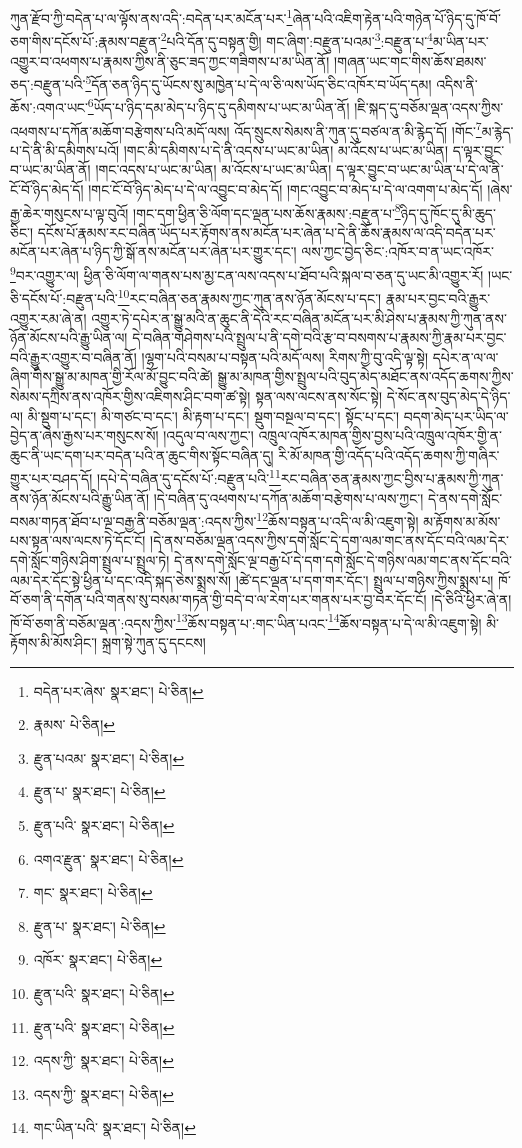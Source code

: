 ཀུན་རྫོབ་ཀྱི་བདེན་པ་ལ་ལྟོས་ནས་འདི་:བདེན་པར་མངོན་པར་\footnote{བདེན་པར་ཞེས་  སྣར་ཐང་།  པེ་ཅིན། }ཞེན་པའི་འཇིག་རྟེན་པའི་གཉེན་པོ་ཉིད་དུ་ཁོ་བོ་ཅག་གིས་དངོས་པོ་:རྣམས་བརྫུན་\footnote{རྣམས་  པེ་ཅིན། }པའི་དོན་དུ་བསྟན་གྱི། གང་ཞིག་:བརྫུན་པའམ་\footnote{རྫུན་པའམ་  སྣར་ཐང་།  པེ་ཅིན། }:བརྫུན་པ་\footnote{རྫུན་པ་  སྣར་ཐང་།  པེ་ཅིན། }མ་ཡིན་པར་འགྱུར་བ་འཕགས་པ་རྣམས་ཀྱིས་ནི་ཅུང་ཟད་ཀྱང་གཟིགས་པ་མ་ཡིན་ནོ། །གཞན་ཡང་གང་གིས་ཆོས་ཐམས་ཅད་:བརྫུན་པའི་\footnote{རྫུན་པའི་  སྣར་ཐང་།  པེ་ཅིན། }དོན་ཅན་ཉིད་དུ་ཡོངས་སུ་མཁྱེན་པ་དེ་ལ་ཅི་ལས་ཡོད་ཅིང་འཁོར་བ་ཡོད་དམ། འདིས་ནི་ཆོས་:འགའ་ཡང་\footnote{འགའ་རྫུན་  སྣར་ཐང་།  པེ་ཅིན། }ཡོད་པ་ཉིད་དམ་མེད་པ་ཉིད་དུ་དམིགས་པ་ཡང་མ་ཡིན་ནོ། །ཇི་སྐད་དུ་བཅོམ་ལྡན་འདས་ཀྱིས་འཕགས་པ་དཀོན་མཆོག་བརྩེགས་པའི་མདོ་ལས། འོད་སྲུངས་སེམས་ནི་ཀུན་དུ་བཙལ་ན་མི་རྙེད་དོ། །གོང་\footnote{གང་  སྣར་ཐང་།  པེ་ཅིན། }མ་རྙེད་པ་དེ་ནི་མི་དམིགས་པའོ། །གང་མི་དམིགས་པ་དེ་ནི་འདས་པ་ཡང་མ་ཡིན། མ་འོངས་པ་ཡང་མ་ཡིན། ད་ལྟར་བྱུང་བ་ཡང་མ་ཡིན་ནོ། །གང་འདས་པ་ཡང་མ་ཡིན། མ་འོངས་པ་ཡང་མ་ཡིན། ད་ལྟར་བྱུང་བ་ཡང་མ་ཡིན་པ་དེ་ལ་ནི་ངོ་བོ་ཉིད་མེད་དོ། །གང་ངོ་བོ་ཉིད་མེད་པ་དེ་ལ་འབྱུང་བ་མེད་དོ། །གང་འབྱུང་བ་མེད་པ་དེ་ལ་འགག་པ་མེད་དོ། །ཞེས་རྒྱ་ཆེར་གསུངས་པ་ལྟ་བུའོ། །གང་དག་ཕྱིན་ཅི་ལོག་དང་ལྡན་པས་ཆོས་རྣམས་:བརྫུན་པ་\footnote{རྫུན་པ་  སྣར་ཐང་།  པེ་ཅིན། }ཉིད་དུ་ཁོང་དུ་མི་ཆུད་ཅིང་། དངོས་པོ་རྣམས་རང་བཞིན་ཡོད་པར་རྟོགས་ནས་མངོན་པར་ཞེན་པ་དེ་ནི་ཆོས་རྣམས་ལ་འདི་བདེན་པར་མངོན་པར་ཞེན་པ་ཉིད་ཀྱི་སྒོ་ནས་མངོན་པར་ཞེན་པར་གྱུར་དང་། ལས་ཀྱང་བྱེད་ཅིང་:འཁོར་བ་ན་ཡང་འཁོར་\footnote{འཁོར་  སྣར་ཐང་།  པེ་ཅིན། }བར་འགྱུར་ལ། ཕྱིན་ཅི་ལོག་ལ་གནས་པས་མྱ་ངན་ལས་འདས་པ་ཐོབ་པའི་སྐལ་བ་ཅན་དུ་ཡང་མི་འགྱུར་རོ། །ཡང་ཅི་དངོས་པོ་:བརྫུན་པའི་\footnote{རྫུན་པའི་  སྣར་ཐང་།  པེ་ཅིན། }རང་བཞིན་ཅན་རྣམས་ཀྱང་ཀུན་ནས་ཉོན་མོངས་པ་དང་། རྣམ་པར་བྱང་བའི་རྒྱུར་འགྱུར་རམ་ཞེ་ན། འགྱུར་ཏེ་དཔེར་ན་སྒྱུ་མའི་ན་ཆུང་ནི་དེའི་རང་བཞིན་མངོན་པར་མི་ཤེས་པ་རྣམས་ཀྱི་ཀུན་ནས་ཉོན་མོངས་པའི་རྒྱུ་ཡིན་ལ། དེ་བཞིན་གཤེགས་པའི་སྤྲུལ་པ་ནི་དགེ་བའི་རྩ་བ་བསགས་པ་རྣམས་ཀྱི་རྣམ་པར་བྱང་བའི་རྒྱུར་འགྱུར་བ་བཞིན་ནོ། །ལྷག་པའི་བསམ་པ་བསྟན་པའི་མདོ་ལས། རིགས་ཀྱི་བུ་འདི་ལྟ་སྟེ། དཔེར་ན་ལ་ལ་ཞིག་གིས་སྒྱུ་མ་མཁན་གྱི་རོལ་མོ་བྱུང་བའི་ཚེ། སྒྱུ་མ་མཁན་གྱིས་སྤྲུལ་པའི་བུད་མེད་མཐོང་ནས་འདོད་ཆགས་ཀྱིས་སེམས་དཀྲིས་ནས་འཁོར་གྱིས་འཇིགས་ཤིང་བག་ཚ་སྟེ། སྟན་ལས་ལངས་ནས་སོང་སྟེ། དེ་སོང་ནས་བུད་མེད་དེ་ཉིད་ལ། མི་སྡུག་པ་དང་། མི་གཙང་བ་དང་། མི་རྟག་པ་དང་། སྡུག་བསྔལ་བ་དང་། སྟོང་པ་དང་། བདག་མེད་པར་ཡིད་ལ་བྱེད་ན་ཞེས་རྒྱས་པར་གསུངས་སོ། །འདུལ་བ་ལས་ཀྱང་། འཁྲུལ་འཁོར་མཁན་གྱིས་བྱས་པའི་འཁྲུལ་འཁོར་གྱི་ན་ཆུང་ནི་ཡང་དག་པར་བདེན་པའི་ན་ཆུང་གིས་སྟོང་བཞིན་དུ། རི་མོ་མཁན་གྱི་འདོད་པའི་འདོད་ཆགས་ཀྱི་གཞིར་གྱུར་པར་བཤད་དོ། །དཔེ་དེ་བཞིན་དུ་དངོས་པོ་:བརྫུན་པའི་\footnote{རྫུན་པའི་  སྣར་ཐང་།  པེ་ཅིན། }རང་བཞིན་ཅན་རྣམས་ཀྱང་བྱིས་པ་རྣམས་ཀྱི་ཀུན་ནས་ཉོན་མོངས་པའི་རྒྱུ་ཡིན་ནོ། །དེ་བཞིན་དུ་འཕགས་པ་དཀོན་མཆོག་བརྩེགས་པ་ལས་ཀྱང་། དེ་ནས་དགེ་སློང་བསམ་གཏན་ཐོབ་པ་ལྔ་བརྒྱ་ནི་བཅོམ་ལྡན་:འདས་ཀྱིས་\footnote{འདས་ཀྱི་  སྣར་ཐང་།  པེ་ཅིན། }ཆོས་བསྟན་པ་འདི་ལ་མི་འཇུག་སྟེ། མ་རྟོགས་མ་མོས་པས་སྟན་ལས་ལངས་ཏེ་དོང་ངོ། །དེ་ནས་བཅོམ་ལྡན་འདས་ཀྱིས་དགེ་སློང་དེ་དག་ལམ་གང་ནས་དོང་བའི་ལམ་དེར་དགེ་སློང་གཉིས་ཤིག་སྤྲུལ་པ་སྤྲུལ་ཏེ། དེ་ནས་དགེ་སློང་ལྔ་བརྒྱ་པོ་དེ་དག་དགེ་སློང་དེ་གཉིས་ལམ་གང་ནས་དོང་བའི་ལམ་དེར་དོང་སྟེ་ཕྱིན་པ་དང་འདི་སྐད་ཅེས་སྨྲས་སོ། །ཚེ་དང་ལྡན་པ་དག་གར་དོང་། སྤྲུལ་པ་གཉིས་ཀྱིས་སྨྲས་པ། ཁོ་བོ་ཅག་ནི་དགོན་པའི་གནས་སུ་བསམ་གཏན་གྱི་བདེ་བ་ལ་རེག་པར་གནས་པར་བྱ་བར་དོང་ངོ། །དེ་ཅིའི་ཕྱིར་ཞེ་ན། ཁོ་བོ་ཅག་ནི་བཅོམ་ལྡན་:འདས་ཀྱིས་\footnote{འདས་ཀྱི་  སྣར་ཐང་།  པེ་ཅིན། }ཆོས་བསྟན་པ་:གང་ཡིན་པའང་\footnote{གང་ཡིན་པའི་  སྣར་ཐང་།  པེ་ཅིན། }ཆོས་བསྟན་པ་དེ་ལ་མི་འཇུག་སྟེ། མི་རྟོགས་མི་མོས་ཤིང་། སྐྲག་སྟེ་ཀུན་དུ་དངངས། 